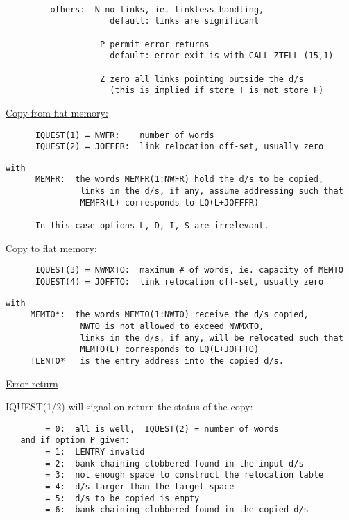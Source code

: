 \begin{verbatim}

         others:  N no links, ie. linkless handling,
                     default: links are significant

                   P permit error returns
                     default: error exit is with CALL ZTELL (15,1)

                   Z zero all links pointing outside the d/s
                     (this is implied if store T is not store F)
\end{verbatim} 

\ul{\large Copy from flat memory:}

\begin{verbatim}
      IQUEST(1) = NWFR:    number of words
      IQUEST(2) = JOFFFR:  link relocation off-set, usually zero
\end{verbatim} 

\begin{verbatim}
with
      MEMFR:  the words MEMFR(1:NWFR) hold the d/s to be copied,
               links in the d/s, if any, assume addressing such that
               MEMFR(L) corresponds to LQ(L+JOFFFR)

      In this case options L, D, I, S are irrelevant.
\end{verbatim} 

\ul{\large Copy to flat memory:}

\begin{verbatim}
      IQUEST(3) = NWMXTO:  maximum # of words, ie. capacity of MEMTO
      IQUEST(4) = JOFFTO:  link relocation off-set, usually zero
\end{verbatim} 


\begin{verbatim}
with
     MEMTO*:  the words MEMTO(1:NWTO) receive the d/s copied,
               NWTO is not allowed to exceed NWMXTO,
               links in the d/s, if any, will be relocated such that
               MEMTO(L) corresponds to LQ(L+JOFFTO)
     !LENTO*   is the entry address into the copied d/s.
\end{verbatim} 

\ul{Error return}

IQUEST(1/2) will signal on return the status of the copy:
\begin{verbatim}
        = 0:  all is well,  IQUEST(2) = number of words
   and if option P given:
        = 1:  LENTRY invalid
        = 2:  bank chaining clobbered found in the input d/s
        = 3:  not enough space to construct the relocation table
        = 4:  d/s larger than the target space
        = 5:  d/s to be copied is empty
        = 6:  bank chaining clobbered found in the copied d/s
\end{verbatim} 


